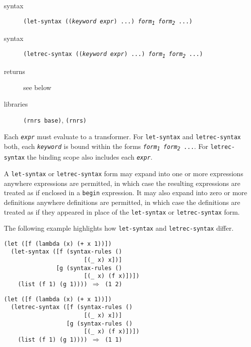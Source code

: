 \begin{description}

\label{syntax_s13}\item[syntax] \texttt{(let-syntax ((\textit{keyword} \textit{expr}) ...) \textit{form\textsubscript{1}} \textit{form\textsubscript{2}} ...)}



\item[syntax] \texttt{(letrec-syntax ((\textit{keyword} \textit{expr}) ...) \textit{form\textsubscript{1}} \textit{form\textsubscript{2}} ...)}



\item[returns] see below


\item[libraries] \texttt{(rnrs base)}, \texttt{(rnrs)}
\end{description}


Each \texttt{\textit{expr}} must evaluate to a transformer.
For \texttt{let-syntax} and \texttt{letrec-syntax} both, each \texttt{\textit{keyword}}
is bound within the
forms \texttt{\textit{form\textsubscript{1}} \textit{form\textsubscript{2}} ...}.
For \texttt{letrec-syntax} the binding scope also includes each \texttt{\textit{expr}}.


\label{syntax_letsyntaximplicitbegin}A \texttt{let-syntax} or \texttt{letrec-syntax} form may expand into one or more
expressions anywhere expressions are permitted, in which case the
resulting expressions are treated as if enclosed in a \texttt{begin}
expression.
It may also expand into zero or more definitions anywhere definitions are permitted,
in which case the definitions are treated as if they appeared in place
of the \texttt{let-syntax} or \texttt{letrec-syntax} form.


The following example highlights how \texttt{let-syntax}
and \texttt{letrec-syntax} differ.


\begin{alltt}
(let ([f (lambda (x) (+ x 1))])
  (let-syntax ([f (syntax-rules ()
                       [(\_{} x) x])]
               [g (syntax-rules ()
                       [(\_{} x) (f x)])])
    (list (f 1) (g 1)))) \(\Rightarrow\) (1 2)

(let ([f (lambda (x) (+ x 1))])
  (letrec-syntax ([f (syntax-rules ()
                       [(\_{} x) x])]
                  [g (syntax-rules ()
                       [(\_{} x) (f x)])])
    (list (f 1) (g 1)))) \(\Rightarrow\) (1 1)
\end{alltt}



